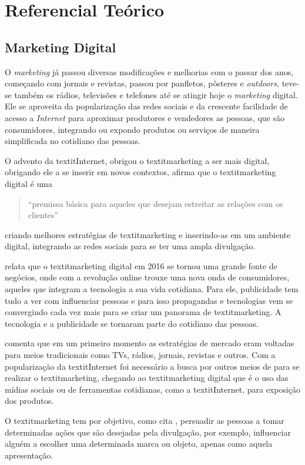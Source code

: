 \chapter[Referencial Teórico]{Referencial Teórico}
\section{Marketing Digital}
O \textit{marketing} já passou diversas modificações e melhorias com o passar dos anos, começando com jornais e revistas, passou por panfletos, pôsteres e \textit{outdoors}, teve-se também os rádios, televisões e telefones até se atingir hoje o \textit{marketing} digital. Ele se aproveita da popularização das redes sociais e da crescente facilidade de acesso a \textit{Internet} para aproximar produtores e vendedores as pessoas, que são consumidores, integrando ou expondo produtos ou serviços de maneira simplificada no cotidiano das pessoas.

O advento da textit{Internet}, obrigou o textit{marketing} a ser mais digital, obrigando ele a se inserir em novos contextos, \cite{canto2017} afirma que o textit{marketing} digital é uma \begin{quote} ``premissa básica para aqueles que desejam estreitar as relações com os clientes''\end{quote} criando melhores estratégias de textit{marketing} e inserindo-as em um ambiente digital, integrando as redes sociais para se ter uma ampla divulgação.

\cite[p.2]{ryan2016} relata que o textit{marketing} digital em 2016 se tornou uma grande fonte de negócios, onde com a revolução online trouxe uma nova onda de consumidores, aqueles que integram a tecnologia a sua vida cotidiana. Para ele, publicidade tem tudo a ver com influenciar pessoas e para isso propagandas e tecnologias vem se convergindo cada vez mais para se criar um panorama de textit{marketing}. A tecnologia e a publicidade se tornaram parte do cotidiano das pessoas.

\cite{santos2014} comenta que em um primeiro momento as estratégias de mercado eram voltadas para meios tradicionais como TVs, rádios, jornais, revistas e outros. Com a popularização da textit{Internet} foi necessário a busca por outros meios de para se realizar
o textit{marketing}, chegando ao textit{marketing} digital que é o uso das mídias sociais ou de ferramentas cotidianas, como a textit{Internet}, para exposição dos produtos.

O textit{marketing} tem por objetivo, como cita \cite{ryan2016}, persuadir as pessoas a tomar determinadas ações que são desejadas pela divulgação, por exemplo, influenciar alguém a escolher uma determinada marca ou objeto, apenas como aquela apresentação.

